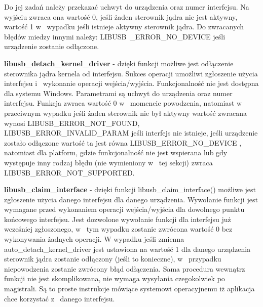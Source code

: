 \documentclass{BscUS}
\begin{document}
\begin{itemize}
{%
Do jej zadań należy przekazać uchwyt do urządzenia oraz numer interfejsu.
Na wyjściu zwraca ona wartość 0, jeśli żaden sterownik jądra nie jest aktywny, wartość 1 w~ wypadku jeśli istnieje aktywny sterownik jądra.
Do zwracanych błędów miedzy innymi należy: LIBUSB~\_ERROR\_NO\_DEVICE jeśli urządzenie zostanie odłączone.
\item \textbf{libusb\_detach\_kernel\_driver} - dzięki funkcji możliwe jest odłączenie sterownika jądra kernela od interfejsu.
Sukces operacji umożliwi zgłoszenie użycia interfejsu i~ wykonanie operacji wejścia/wyjścia.
Funkcjonalność nie jest dostępna dla systemu Windows.
Parametrami są uchwyt do urządzenia oraz numer interfejsu.
Funkcja zwraca wartość 0 w~ momencie powodzenia, natomiast w~ przeciwnym wypadku jeśli żaden sterownik nie był aktywny wartość zwracana wynosi LIBUSB\_ERROR\_NOT\_FOUND, LIBUSB\_ERROR\_INVALID\_PARAM jeśli interfejs nie istnieje, jeśli urządzenie zostało odłączone wartość ta jest równa LIBUSB\_ERROR\_NO\_DEVICE , natomiast dla platform, gdzie funkcjonalność nie jest wspierana lub gdy występuje inny rodzaj błędu (nie wymieniony w~ tej sekcji) zwraca LIBUSB\_ERROR\_NOT\_SUPPORTED.
\item \textbf{libusb\_claim\_interface} - dzięki funkcji libusb\_claim\_interface() możliwe jest zgłoszenie użycia danego interfejsu dla danego urządzenia.
Wywołanie funkcji jest wymagane przed wykonaniem operacji wejścia/wyjścia dla dowolnego punktu końcowego interfejsu.
Jest dozwolone wywołanie funkcji dla interfejsu już wcześniej zgłoszonego, w~ tym wypadku zostanie zwrócona wartość 0 bez wykonywania żadnych operacji.
W wypadku jeśli zmienna auto\_detach\_kernel\_driver jest ustawiona na wartość 1 dla danego urządzenia sterownik jądra zostanie odłączony (jeśli to konieczne), w~ przypadku niepowodzenia zostanie zwrócony błąd odłączenia.
Sama procedura wewnątrz funkcji nie jest skomplikowana, nie wymaga wysyłania czegokolwiek po magistrali. Są to proste instrukcje mówiące systemowi operacyjnemu iż aplikacja chce korzystać z~ danego interfejsu.
}
\end{itemize}
\end{document}
